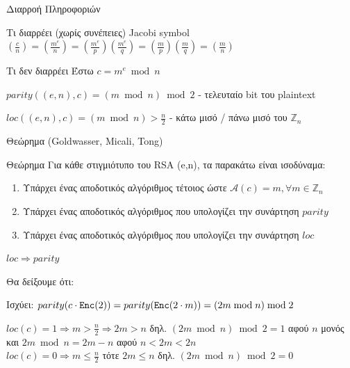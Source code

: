 \documentclass[handout]{beamer}
\begin{document}
\begin{frame}{Διαρροή Πληροφοριών}
\begin{block}{Τι διαρρέει (χωρίς συνέπειες)}
Jacobi symbol
$(\frac{c}{n}) = (\frac{m^e}{n}) = (\frac{m^e}{p}) (\frac{m^e}{q}) =  (\frac{m}{p}) (\frac{m}{q}) = (\frac{m}{n}) $
\end{block}

\begin{block}{Τι δεν διαρρέει}
Έστω $c = m^e \bmod{n}$

$parity((e,n), c) = (m \bmod n) \bmod 2$ - τελευταίο bit του plaintext

$loc((e,n), c) = (m \bmod n) > \frac{n}{2}$ - κάτω μισό / πάνω μισό του $\mathbb{Z}_n$
\end{block}
\end{frame}


\begin{frame}{Θεώρημα (Goldwasser, Micali, Tong)}

\begin{block}{Θεώρημα}
Για κάθε στιγμιότυπο του RSA (e,n), τα παρακάτω είναι ισοδύναμα:
\begin{enumerate}
\item  Υπάρχει ένας αποδοτικός αλγόριθμος \adv τέτοιος ώστε  $\mathcal{A}(c)  = m, \forall m \in \mathbb{Z}_n$ 
\item  Υπάρχει ένας αποδοτικός αλγόριθμος που υπολογίζει την συνάρτηση $parity$
\item  Υπάρχει ένας αποδοτικός αλγόριθμος που υπολογίζει την συνάρτηση $loc$
\end{enumerate}
\end{block}
\end{frame}


\begin{frame}{$loc \Rightarrow parity$}

Θα δείξουμε ότι:   \pause

Ισχύει: $parity( c \cdot \mathtt{Enc}(2)) = parity( \mathtt{Enc}(2 \cdot m)) = (2m \bmod n) \bmod 2$
\medskip\\ \pause

$loc(c)=1 \Rightarrow m > \frac{n}{2} \Rightarrow 2m > n$ δηλ. $(2m \bmod n) \bmod 2 = 1$ αφού $n$ μονός \\και $2m \bmod n = 2m - n$ αφού $n < 2m <2n$\\
\medskip \pause
$loc(c)=0 \Rightarrow m \leq \frac{n}{2}$ τότε $2m \leq n$ δηλ. $(2m \bmod n) \bmod 2 = 0$  
 
\end{frame}
\end{document}
